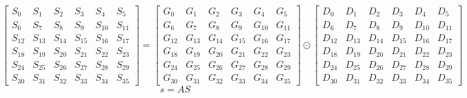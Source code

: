 \documentclass{article}%
\begin{document}
\[%
\left[\begin{matrix}S_{0} & S_{1} & S_{2} & S_{3} & S_{4} & S_{5}\\S_{6} & S_{7} & S_{8} & S_{9} & S_{10} & S_{11}\\S_{12} & S_{13} & S_{14} & S_{15} & S_{16} & S_{17}\\S_{18} & S_{19} & S_{20} & S_{21} & S_{22} & S_{23}\\S_{24} & S_{25} & S_{26} & S_{27} & S_{28} & S_{29}\\S_{30} & S_{31} & S_{32} & S_{33} & S_{34} & S_{35}\end{matrix}\right] = \left[\begin{matrix}G_{0} & G_{1} & G_{2} & G_{3} & G_{4} & G_{5}\\G_{6} & G_{7} & G_{8} & G_{9} & G_{10} & G_{11}\\G_{12} & G_{13} & G_{14} & G_{15} & G_{16} & G_{17}\\G_{18} & G_{19} & G_{20} & G_{21} & G_{22} & G_{23}\\G_{24} & G_{25} & G_{26} & G_{27} & G_{28} & G_{29}\\G_{30} & G_{31} & G_{32} & G_{33} & G_{34} & G_{35}\end{matrix}\right] \odot \left[\begin{matrix}D_{0} & D_{1} & D_{2} & D_{3} & D_{4} & D_{5}\\D_{6} & D_{7} & D_{8} & D_{9} & D_{10} & D_{11}\\D_{12} & D_{13} & D_{14} & D_{15} & D_{16} & D_{17}\\D_{18} & D_{19} & D_{20} & D_{21} & D_{22} & D_{23}\\D_{24} & D_{25} & D_{26} & D_{27} & D_{28} & D_{29}\\D_{30} & D_{31} & D_{32} & D_{33} & D_{34} & D_{35}\end{matrix}\right]%
\]%
\[%
s = AS%
\]%
\end{document}
